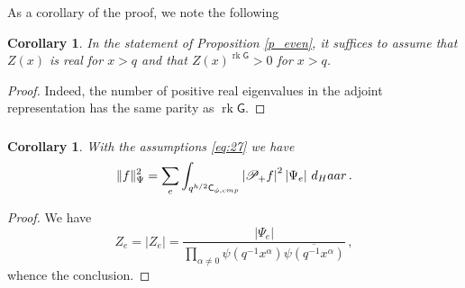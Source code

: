 \documentclass[14pt]{extarticle}
\newcommand{\R}{\mathbb{R}}
\newcommand{\bG}{\mathsf{G}}
\newcommand{\bC}{\mathsf{C}}
\newcommand{\cP}{\mathscr{P}}
\newcommand{\comp}{\textup{cmp}}
\DeclareMathOperator{\rk}{rk}
\newtheorem{Proposition}[Lemma]{Proposition}
\newtheorem{Corollary}[Lemma]{Corollary}
\theoremstyle{definition}
\begin{document}
\noindent
As a corollary of the proof, we note the following


\begin{Corollary}
In the statement of Proposition \ref{p_even}, it suffices to assume
that $Z(x)$ is real for $x>q$ and that $Z(x)^{\rk \bG} > 0$ for
$x>q$. 
\end{Corollary}
\begin{proof}
Indeed, the number of positive real eigenvalues in the adjoint
representation has the same parity as $\rk \bG$. 
\end{proof}

 \subsubsection{}


 \begin{Corollary}
   With the assumptions \eqref{eq:27} we have
   \begin{equation}
    \label{eq:137bisbis}
    \|f \|_\Psi^2 =
    \sum_{e} 
    \int_{q^{h/2} \bC_{\phi,\comp}} \left| \cP_+ f  \right|^2 
   \left| \Psi_e \right|  \, 
      d_\textup{Haar}  \,. 
    \end{equation}
  \end{Corollary}

  \begin{proof}
    We have
    \[
      Z_e = |Z_e| = \frac{|\Psi_e|}{\prod_{\alpha \ne 0} \psi(q^{-1}
      x^\alpha) \overline{\psi(q^{-1}
        x^\alpha)}} \,, 
    \]
    whence the conclusion. 
  \end{proof}
 




\end{document}
